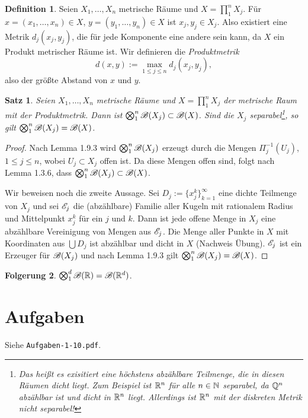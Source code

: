 \documentclass[
 a4paper,
 12pt,
 parskip=half
 ]{scrreprt}
\theoremstyle{plain}
\newtheorem{thm}{Satz}[section] %
\theoremstyle{definition}
\newtheorem{folg}[thm]{Folgerung}
\newtheorem*{defn*}{Definition}
\numberwithin{equation}{section}
\begin{document}
\begin{defn*}
 Seien $X_1, \ldots, X_n$ metrische Räume und $X = \prod_1^n X_j$. Für $x = (x_1, \ldots, x_n) \in X$, $y = (y_1, \ldots, y_n) \in X$ ist $x_j, y_j \in X_j$. Also existiert eine Metrik $d_j(x_j,y_j)$, die für jede Komponente eine andere sein kann, da $X$ ein Produkt metrischer Räume ist. Wir definieren die \emph{Produktmetrik}
 \[ d(x,y) := \max_{1 \le j \le n} d_j(x_j,y_j), \]
 also der größte Abstand von $x$ und $y$.
\end{defn*}
 
\begin{thm}
 Seien $X_1, \ldots, X_n$ metrische Räume und $X = \prod_1^n X_j$ der metrische Raum mit der Produktmetrik. Dann ist $\bigotimes_1^n \mathscr{B}(X_j) \subset \mathscr{B}(X)$. Sind die $X_j$ separabel\footnote{Das heißt es exisitiert eine höchstens abzählbare Teilmenge, die in diesen Räumen dicht liegt. Zum Beispiel ist $\mathbb{R}^n$ für alle $n \in \mathbb{N}$ separabel, da $\mathbb{Q}^n$ abzählbar ist und dicht in $\mathbb{R}^n$ liegt. Allerdings ist $\mathbb{R}^n$ mit der diskreten Metrik nicht separabel!}, so gilt $\bigotimes_1^n \mathscr{B}(X_j) = \mathscr{B}(X)$.
\end{thm}

\begin{proof}
 Nach Lemma 1.9.3 wird $\bigotimes_1^n \mathscr{B}(X_j)$ erzeugt durch die Mengen $\Pi_j^{-1}( U_j )$, $1 \le j \le n$, wobei $U_j \subset X_j$ offen ist. Da diese Mengen offen sind, folgt nach Lemma 1.3.6, dass $\bigotimes_1^n \mathscr{B}(X_j) \subset \mathscr{B}(X)$.
 
 Wir beweisen noch die zweite Aussage. Sei $D_j := \{ x_j^k \}_{k=1}^\infty$ eine dichte Teilmenge von $X_j$ und sei $\mathscr{E}_j$ die (abzählbare) Familie aller Kugeln mit rationalem Radius und Mittelpunkt $x_j^k$ für ein $j$ und $k$. Dann ist jede offene Menge in $X_j$ eine abzählbare Vereinigung von Mengen aus $\mathscr{E}_j$. Die Menge aller Punkte in $X$ mit Koordinaten aus $\bigcup D_j$ ist abzählbar und dicht in $X$ (Nachweis Übung). $\mathscr{E}_j$ ist ein Erzeuger für $\mathscr{B}(X_j)$ und nach Lemma 1.9.3 gilt $\bigotimes_1^n \mathscr{B}(X_j) = \mathscr{B}(X)$.
\end{proof}

\begin{folg}
 $\bigotimes_1^d \mathscr{B}(\mathbb{R}) = \mathscr{B}(\mathbb{R}^d)$.
\end{folg}

\section{Aufgaben}
Siehe \verb+Aufgaben-1-10.pdf+.
\end{document}
